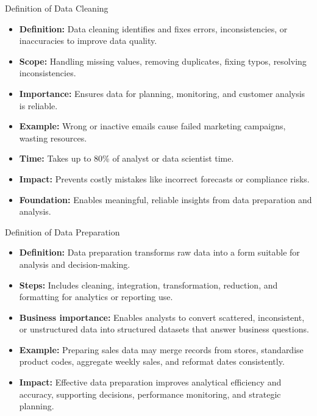 \documentclass[aspectratio=169, table]{beamer}
\begin{document}
\begin{frame}{Definition of Data Cleaning}
	\vspace{20pt}
	
	\begin{itemize}
		\item \textbf{Definition:} Data cleaning identifies and fixes errors, inconsistencies, or inaccuracies to improve data quality.
		
		\item \textbf{Scope:} Handling missing values, removing duplicates, fixing typos, resolving inconsistencies.
		
		\item \textbf{Importance:} Ensures data for planning, monitoring, and customer analysis is reliable.
		
		\item \textbf{Example:} Wrong or inactive emails cause failed marketing campaigns, wasting resources.
		
		\item \textbf{Time:} Takes up to 80\% of analyst or data scientist time.
		
		\item \textbf{Impact:} Prevents costly mistakes like incorrect forecasts or compliance risks.
		
		\item \textbf{Foundation:} Enables meaningful, reliable insights from data preparation and analysis.
	\end{itemize}
	
\end{frame}

\begin{frame}{Definition of Data Preparation}
	\vspace{20pt}
	
	\begin{itemize}
		\item \textbf{Definition:} Data preparation transforms raw data into a form suitable for analysis and decision-making.
		
		\item \textbf{Steps:} Includes cleaning, integration, transformation, reduction, and formatting for analytics or reporting use.
		
		\item \textbf{Business importance:} Enables analysts to convert scattered, inconsistent, or unstructured data into structured datasets that answer business questions.
		
		\item \textbf{Example:} Preparing sales data may merge records from stores, standardise product codes, aggregate weekly sales, and reformat dates consistently.
		
		\item \textbf{Impact:} Effective data preparation improves analytical efficiency and accuracy, supporting decisions, performance monitoring, and strategic planning.
	\end{itemize}
	
\end{frame}
\end{document}
